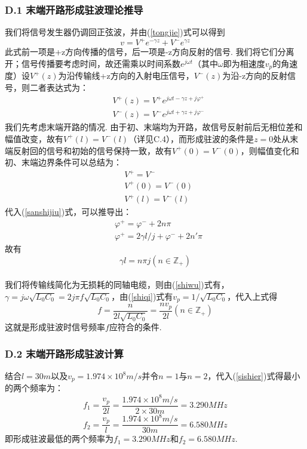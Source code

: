 \documentclass[UTF8]{ctexart}
\begin{document}
\subsubsection*{D.1 末端开路形成驻波理论推导}
我们将信号发生器仍调回正弦波，并由(\ref{tongjie})式可以得到
\[v=V^+e^{-\gamma z}+V^-e^{\gamma z}\]
此式前一项是+z方向传播的信号，后一项是-z方向反射的信号. 我们将它们分离开；信号传播要考虑时间，故还需乘以时间系数$e^{j\omega t}$（其中$\omega$即为相速度$v_p$的角速度）设$V^+(z)$为沿传输线+z方向的入射电压信号，$V^-(z)$为沿-z方向的反射信号，则二者表达式为：
\begin{equation}
    \begin{aligned}
    &V^+(z)=V^+ e^{j\omega t-\gamma z+j\varphi^+}\\
    &V^-(z)=V^- e^{j\omega t+\gamma z+j\varphi^-}
    \end{aligned}\label{sanshijiu}
\end{equation}
我们先考虑末端开路的情况. 由于初、末端均为开路，故信号反射前后无相位差和幅值改变，故有$V^+(l)=V^-(l)$（详见C.4），而形成驻波的条件是$z=0$处从末端反射回的信号和初始的信号保持一致，故有$V^+(0)=V^-(0)$，则幅值变化和初、末端边界条件可以总结为：
\begin{equation}
    \begin{aligned}
    &V^+=V^-\\
    &V^+(0)=V^-(0)\\
    &V^+(l)=V^-(l)
    \end{aligned}
\end{equation}
代入(\ref{sanshijiu})式，可以推导出：
\begin{equation}
    \begin{aligned}
        &\varphi^+=\varphi^-+2n\pi\\
        &\varphi^+=2\gamma l/j+\varphi^-+2n'\pi
    \end{aligned}
\end{equation}
故有\begin{equation}\gamma l=n\pi j(n\in \mathbb{Z}_+)\label{sishier}\end{equation}\\
我们将传输线简化为无损耗的同轴电缆，则由(\ref{shiwu})式有，$\gamma=j\omega\sqrt{L_0C_0}=2j\pi f\sqrt{L_0C_0}$，由(\ref{shiqi})式有$v_p=1/\sqrt{L_0C_0}$，代入上式得
\begin{equation}f=\frac{n}{2l\sqrt{L_0C_0}}=\frac{nv_p}{2l}(n\in \mathbb{Z}_+)\label{sishier}
\end{equation}
这就是形成驻波时信号频率$f$应符合的条件.


\subsubsection*{D.2 末端开路形成驻波计算}
结合$l=30m$以及$v_p=1.974\times 10^8m/s$并令$n=1$与$n=2$，代入(\ref{sishier})式得最小的两个频率为：
\begin{equation}
    f_1=\frac{v_p}{2l}=\frac{1.974\times 10^8m/s}{2\times 30m}=3.290MHz
\end{equation}
\begin{equation}
    f_2=\frac{v_p}{l}=\frac{1.974\times 10^8m/s}{30m}=6.580MHz
\end{equation}
即形成驻波最低的两个频率为$f_1=3.290MHz$和$f_2=6.580MHz$.
\end{document}
